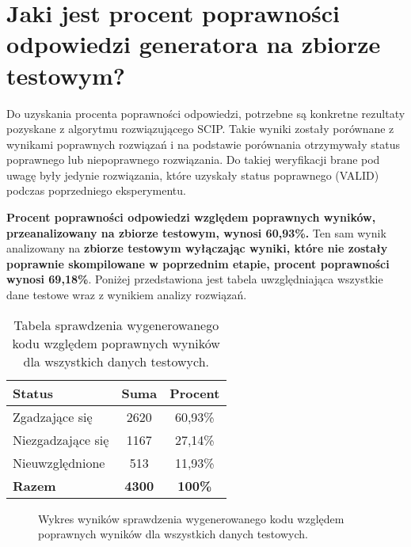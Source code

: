 \section{Jaki jest procent poprawności odpowiedzi generatora na zbiorze testowym?} %


Do uzyskania procenta poprawności odpowiedzi, potrzebne są konkretne rezultaty pozyskane z algorytmu rozwiązującego SCIP. Takie wyniki zostały porównane z wynikami poprawnych rozwiązań i na podstawie porównania otrzymywały status poprawnego lub niepoprawnego rozwiązania. Do takiej weryfikacji brane pod uwagę były jedynie rozwiązania, które uzyskały status poprawnego (VALID) podczas poprzedniego eksperymentu.

\textbf{Procent poprawności odpowiedzi względem poprawnych wyników, przeanalizowany na zbiorze testowym, wynosi 60,93\%.} Ten sam wynik analizowany na \textbf{zbiorze testowym wyłączając wyniki, które nie zostały poprawnie skompilowane w poprzednim etapie, procent poprawności wynosi 69,18\%}. Poniżej przedstawiona jest tabela uwzględniająca wszystkie dane testowe wraz z wynikiem analizy rozwiązań.

\begin{table}[ht]
\caption{Tabela sprawdzenia wygenerowanego kodu względem poprawnych wyników dla wszystkich danych testowych.}\label{tab:tabela4}
\centering%
\begin{tabular}{|l|c|c|}
\hline
\textbf{Status} & \textbf{Suma} & \textbf{Procent} \\
\hline
Zgadzające się & 2620 & 60,93\% \\
\hline
Niezgadzające się & 1167 & 27,14\% \\
\hline
Nieuwzględnione & 513 & 11,93\% \\
\hline
\textbf{Razem} & \textbf{4300} & \textbf{100\%} \\
\hline
\end{tabular}
\end{table}

\begin{figure}[H]
\centering
{}
\caption{Wykres wyników sprawdzenia wygenerowanego kodu względem poprawnych wyników dla wszystkich danych testowych.}\label{rys:plama2d}
\end{figure}


